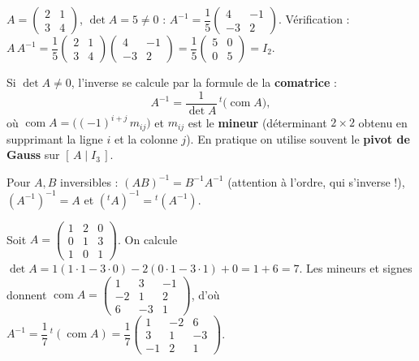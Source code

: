 \begin{exemple}
$A=\begin{pmatrix}2&1\\3&4\end{pmatrix}$, $\det A=5\neq0$ :
$A^{-1}=\dfrac15\begin{pmatrix}4&-1\\-3&2\end{pmatrix}$. Vérification :
$A\,A^{-1}=\dfrac15\begin{pmatrix}2&1\\3&4\end{pmatrix}\!\begin{pmatrix}4&-1\\-3&2\end{pmatrix}
=\dfrac15\begin{pmatrix}5&0\\0&5\end{pmatrix}=I_2.$
\end{exemple}

\begin{propriete}
Si $\det A\neq0$, l'inverse se calcule par la formule de la \textbf{comatrice} :
\[
A^{-1}=\frac1{\det A}\,{}^{t}\!\big(\operatorname{com}A\big),
\]
où $\operatorname{com}A=\big((-1)^{i+j}\,m_{ij}\big)$ et $m_{ij}$ est le \textbf{mineur}
(déterminant $2\times2$ obtenu en supprimant la ligne $i$ et la colonne $j$).
En pratique on utilise souvent le \textbf{pivot de Gauss} sur $[\,A\mid I_3\,]$.
\end{propriete}

\begin{remarque}
Pour $A,B$ inversibles : $(AB)^{-1}=B^{-1}A^{-1}$ (attention à l'ordre, qui s'inverse !),
$(A^{-1})^{-1}=A$ et $({}^{t}\!A)^{-1}={}^{t}(A^{-1})$.
\end{remarque}

\begin{exemple}
Soit $A=\begin{pmatrix}1&2&0\\0&1&3\\1&0&1\end{pmatrix}$. On calcule
$\det A=1(1\cdot1-3\cdot0)-2(0\cdot1-3\cdot1)+0=1+6=7$. Les mineurs et signes donnent
$\operatorname{com}A=\begin{pmatrix}1&3&-1\\-2&1&2\\6&-3&1\end{pmatrix}$, d'où
$A^{-1}=\dfrac17\,{}^{t}(\operatorname{com}A)=\dfrac17\begin{pmatrix}1&-2&6\\3&1&-3\\-1&2&1\end{pmatrix}$.
\end{exemple}

